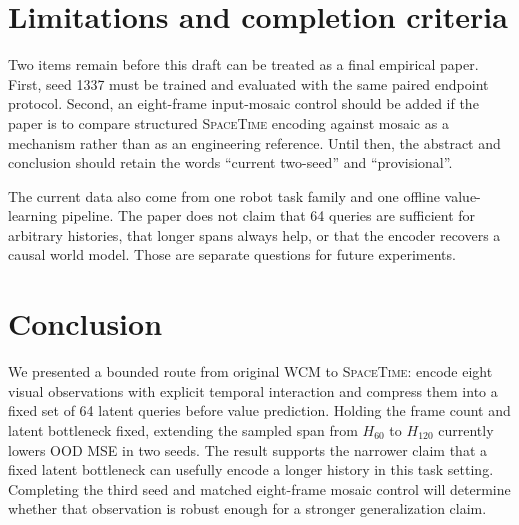 \documentclass[10pt,a4paper]{article}
\newcommand{\SpaceTime}{\textsc{SpaceTime}}
\begin{document}
\section{Limitations and completion criteria}

Two items remain before this draft can be treated as a final empirical paper. First, seed 1337 must be trained and evaluated with the same paired endpoint protocol. Second, an eight-frame input-mosaic control should be added if the paper is to compare structured \SpaceTime{} encoding against mosaic as a mechanism rather than as an engineering reference. Until then, the abstract and conclusion should retain the words ``current two-seed'' and ``provisional''.

The current data also come from one robot task family and one offline value-learning pipeline. The paper does not claim that 64 queries are sufficient for arbitrary histories, that longer spans always help, or that the encoder recovers a causal world model. Those are separate questions for future experiments.

\section{Conclusion}

We presented a bounded route from original WCM to \SpaceTime{}: encode eight visual observations with explicit temporal interaction and compress them into a fixed set of 64 latent queries before value prediction. Holding the frame count and latent bottleneck fixed, extending the sampled span from $H_{60}$ to $H_{120}$ currently lowers OOD MSE in two seeds. The result supports the narrower claim that a fixed latent bottleneck can usefully encode a longer history in this task setting. Completing the third seed and matched eight-frame mosaic control will determine whether that observation is robust enough for a stronger generalization claim.



\end{document}
